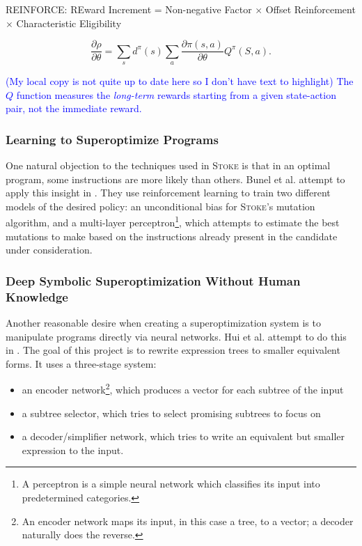 \documentclass[12pt,twoside]{reedthesis}
\newcommand{\comment}[2]{\textbf{#1} \textcolor{blue}{#2}}
\begin{document}
\textsc{REINFORCE}: REward Increment = Non-negative Factor $\times$ Offset Reinforcement $\times$ Characteristic Eligibility
\cite{sutton1999policygradient}

\[
    \frac{\partial \rho}{\partial \theta} = \sum_s d^\pi(s) \sum_a \frac{\partial \pi(s,a)}{\partial \theta}Q^\pi(S,a).
\]

\comment{}{(My local copy is not quite up to date here so I don't have text to highlight) The $Q$ function measures the \emph{long-term} rewards starting from a given state-action pair, not the immediate reward.}

\subsubsection{Learning to Superoptimize Programs}
One natural objection to the techniques used in \textsc{Stoke} is that in an optimal program, some instructions are more likely than others.
Bunel et al. attempt to apply this insight in \cite{bunel2017learning}.
They use reinforcement learning to train two different models of the desired policy:
    an unconditional bias for \textsc{Stoke}'s mutation algorithm,
    and a multi-layer perceptron\footnote{A perceptron is a simple neural network which classifies its input into predetermined categories.},
        which attempts to estimate the best mutations to make based on the instructions already present in the candidate under consideration.

\subsubsection{Deep Symbolic Superoptimization Without Human Knowledge}
Another reasonable desire when creating a superoptimization system is to manipulate programs directly via neural networks.
Hui et al. attempt to do this in \cite{hui2020deep}. 
The goal of this project is to rewrite expression trees to smaller equivalent forms. 
It uses a three-stage system:
\begin{itemize}
    \item an encoder network\footnote{An encoder network maps its input, in this case a tree, to a vector; a decoder naturally does the reverse.}, which produces a vector for each subtree of the input
    \item a subtree selector, which tries to select promising subtrees to focus on
    \item a decoder/simplifier network, which tries to write an equivalent but smaller expression to the input.
\end{itemize}
    
\end{document}
